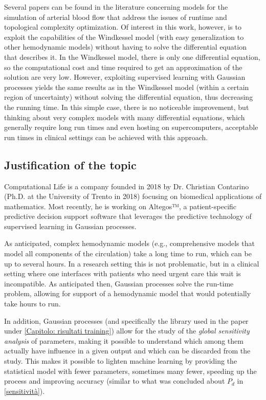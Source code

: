 Several papers can be found in the literature concerning models for the simulation of arterial blood flow that address the issues of runtime and topological complexity optimization. Of interest in this work, however, is to exploit the capabilities of the Windkessel model (with easy generalization to other hemodynamic models) without having to solve the differential equation that describes it. In the Windkessel model, there is only one differential equation, so the computational cost and time required to get an approximation of the solution are very low. However, exploiting supervised learning with Gaussian processes yields the same results as in the Windkessel model (within a certain region of uncertainty) without solving the differential equation, thus decreasing the running time. In this simple case, there is no noticeable improvement, but thinking about very complex models with many differential equations, which generally require long run times and even hosting on supercomputers, acceptable run times in clinical settings can be achieved with this approach.

\newpage

\subsection{Justification of the topic}
Computational Life is a company founded in 2018 by Dr. Christian Contarino (Ph.D. at the University of Trento in 2018) focusing on biomedical applications of mathematics. Most recently, he is working on Altegos™, a patient-specific predictive decision support software that leverages the predictive technology of supervised learning in Gaussian processes. 

As anticipated, complex hemodynamic models (e.g., comprehensive models that model all components of the circulation) take a long time to run, which can be up to several hours. In a research setting this is not problematic, but in a clinical setting where one interfaces with patients who need urgent care this wait is incompatible. As anticipated then, Gaussian processes solve the run-time problem, allowing for support of a hemodynamic model that would potentially take hours to run.

In addition, Gaussian processes (and specifically the library used in the paper under \ref{Capitolo: risultati training}) allow for the study of the \textit{global sensitivity analysis} of parameters, making it possible to understand which among them actually have influence in a given output and which can be discarded from the study. This makes it possible to lighten machine learning by providing the statistical model with fewer parameters, sometimes many fewer, speeding up the process and improving accuracy (similar to what was concluded about $P_d$ in \ref{sensitività}).

